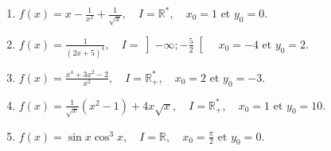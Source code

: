 \documentclass[12pt]{article}
\begin{document}
\begin{enumerate}
    \item $f(x) = x - \frac{1}{x^2} + \frac{1}{\sqrt{x}}, \quad I = \mathbb{R}^*, \quad x_0 = 1 \text{ et } y_0 = 0.$
    
    \item $f(x) = \frac{1}{(2x+5)^4}, \quad I = \left]-\infty; -\frac{5}{2}\right[ \quad x_0 = -4 \text{ et } y_0 = 2.$
    
    \item $f(x) = \frac{x^4 + 3x^2 - 2}{x^{2}}, \quad I = \mathbb{R}_+^{*}, \quad x_0 = 2 \text{ et } y_0 = -3.$
    
    \item $f(x) = \frac{1}{\sqrt{x}} (x^2 - 1) + 4x\sqrt{x}, \quad I = \mathbb{R}_+^{*}, \quad x_0 = 1 \text{ et } y_0 = 10.$
    
    \item $f(x) = \sin x \cos^3 x, \quad I = \mathbb{R}, \quad x_0 = \frac{\pi}{2} \text{ et } y_0 = 0.$
\end{enumerate}
\end{document}
